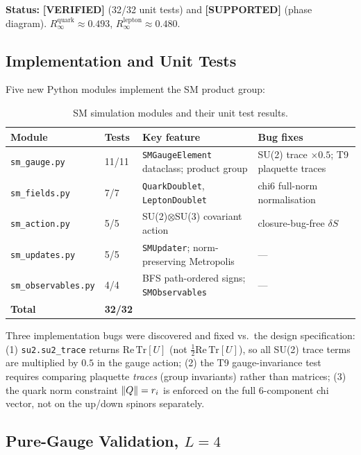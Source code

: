 \documentclass[12pt,a4paper]{article}
\newcommand{\validated}{\textcolor{green!55!black}{\textbf{[VERIFIED]}}}
\newcommand{\supported}{\textcolor{blue!70!black}{\textbf{[SUPPORTED]}}}
\theoremstyle{plain}
\theoremstyle{definition}
\theoremstyle{remark}
\begin{document}
\begin{statusbox}
\textbf{Status:} \validated{} (32/32 unit tests) and \supported{} (phase diagram).
$R_\infty^\text{quark}\approx0.493$, $R_\infty^\text{lepton}\approx0.480$.
\end{statusbox}

\subsection{Implementation and Unit Tests}

Five new Python modules implement the SM product group:

\begin{table}[ht]
\centering
\caption{SM simulation modules and their unit test results.}
\label{tab:sm_modules}
\begin{tabular}{llll}
\toprule
Module & Tests & Key feature & Bug fixes \\
\midrule
\texttt{sm\_gauge.py}      & 11/11 & \texttt{SMGaugeElement} dataclass; product group & SU(2) trace $\times0.5$; T9 plaquette traces \\
\texttt{sm\_fields.py}     & 7/7   & \texttt{QuarkDoublet}, \texttt{LeptonDoublet} & chi6 full-norm normalisation \\
\texttt{sm\_action.py}     & 5/5   & SU(2)$\otimes$SU(3) covariant action & closure-bug-free $\delta S$ \\
\texttt{sm\_updates.py}    & 5/5   & \texttt{SMUpdater}; norm-preserving Metropolis & --- \\
\texttt{sm\_observables.py}& 4/4   & BFS path-ordered signs; \texttt{SMObservables} & --- \\
\midrule
\textbf{Total}             & \textbf{32/32} & & \\
\bottomrule
\end{tabular}
\end{table}

Three implementation bugs were discovered and fixed vs.\ the design specification:
(1) \texttt{su2.su2\_trace} returns $\mathrm{Re}\,\mathrm{Tr}[U]$ (not
$\frac{1}{2}\mathrm{Re}\,\mathrm{Tr}[U]$), so all SU(2) trace terms are multiplied by
$0.5$ in the gauge action;
(2) the T9 gauge-invariance test requires comparing plaquette \emph{traces} (group
invariants) rather than matrices;
(3) the quark norm constraint $\norm{Q}=r_i$ is enforced on the full 6-component
chi vector, not on the up/down spinors separately.

\subsection{Pure-Gauge Validation, $L=4$}
\end{document}
